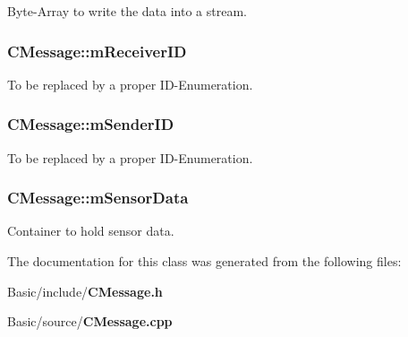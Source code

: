 Byte-\/\-Array to write the data into a stream. 

\subsubsection[{m\-Receiver\-I\-D}]{ C\-Message\-::m\-Receiver\-I\-D}\label{classCMessage_a2b381caf915e37fe99ebf96d5d2d3e18}


To be replaced by a proper I\-D-\/\-Enumeration. 

\subsubsection[{m\-Sender\-I\-D}]{ C\-Message\-::m\-Sender\-I\-D}\label{classCMessage_a7639c7dc3fd845286966ce86b69023bd}


To be replaced by a proper I\-D-\/\-Enumeration. 

\subsubsection[{m\-Sensor\-Data}]{ C\-Message\-::m\-Sensor\-Data}\label{classCMessage_a36722ef8eaac64c49f8ff15c396a1186}


Container to hold sensor data. 



The documentation for this class was generated from the following files\-:\begin{DoxyCompactItemize}
\item 
Basic/include/{\bf C\-Message.\-h}\item 
Basic/source/{\bf C\-Message.\-cpp}\end{DoxyCompactItemize}

